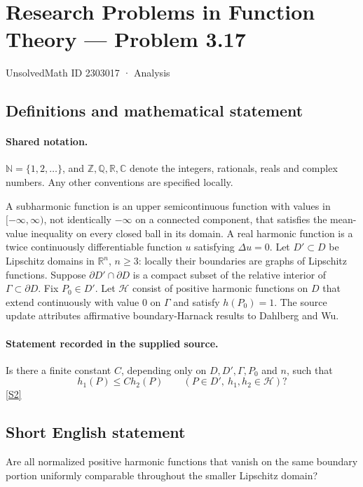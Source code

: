 \documentclass[11pt]{article}
\newcommand{\sref}[2]{\hyperlink{source:#1:#2}{[S#2]}}
\begin{document}
\setcounter{section}{2303016}
\section{Research Problems in Function Theory — Problem 3.17}\label{2303017}
{\small\sffamily UnsolvedMath ID 2303017 · Analysis}
\subsection{Definitions and mathematical statement}

\paragraph{Shared notation.}$\mathbb N=\{1,2,\ldots\}$, and $\mathbb Z,\mathbb Q,\mathbb R,\mathbb C$ denote the integers, rationals, reals and complex numbers. Any other conventions are specified locally.


A subharmonic function is an upper semicontinuous function with values in $[-\infty,\infty)$, not identically $-\infty$ on a connected component, that satisfies the mean-value inequality on every closed ball in its domain. A real harmonic function is a twice continuously differentiable function $u$ satisfying $\Delta u=0$. Let $D'\subset D$ be Lipschitz domains in $\mathbb R^n$, $n\geq3$: locally their boundaries are graphs of Lipschitz functions. Suppose $\partial D'\cap\partial D$ is a compact subset of the relative interior of $\Gamma\subset\partial D$. Fix $P_0\in D'$. Let $\mathcal H$ consist of positive harmonic functions on $D$ that extend continuously with value $0$ on $\Gamma$ and satisfy $h(P_0)=1$.
The source update attributes affirmative boundary-Harnack results to Dahlberg and Wu.
\paragraph{Statement recorded in the supplied source.}
Is there a finite constant $C$, depending only on $D,D',\Gamma,P_0$ and $n$, such that
\[h_1(P)\leq C h_2(P)\qquad(P\in D',\ h_1,h_2\in\mathcal H)?\] \sref{2303017}{2}
\subsection{Short English statement}
Are all normalized positive harmonic functions that vanish on the same boundary portion uniformly comparable throughout the smaller Lipschitz domain?
\end{document}

